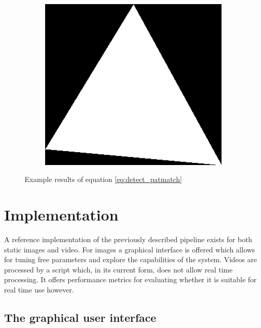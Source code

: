 \documentclass{report}
\begin{document}
\begin{figure}
\begin{subfigure}[t]{0.3\textwidth}
  \end{subfigure}
  \qquad
  \begin{subfigure}[t]{0.3\textwidth}
    \includegraphics[width=1\textwidth]{src/patmatch_tri2}
  \end{subfigure}
  \caption{Example results of equation \ref{eq:detect_patmatch}}
\end{figure}


\pagebreak
\chapter{Implementation}
\label{chap:implementation}

A reference implementation of the previously described pipeline exists
for both static images and video. For images a graphical interface is
offered which allows for tuning free parameters and explore the
capabilities of the system. Videos are processed by a script which, in
its current form, does not allow real time processing. It offers
performance metrics for evaluating whether it is suitable for real
time use however.

\section{The graphical user interface}
\end{document}
